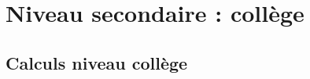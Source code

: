 \documentclass[12pt]{book}
\begin{document}
%

\chapter{Niveau secondaire : collège}

\newpage

\section{Calculs niveau collège}

\newpage




%





%

%

%


%

\cleardoublepage
\setcounter{tocdepth}{2}
\renewcommand{\contentsname}{Table des matières détaillée}
\tableofcontents
\cleardoublepage
\renewcommand{\contentsname}{Table des matières}

\cleardoublepage
\renewcommand{\listfigurename}{Liste des figures}
\listoffigures
\end{document}
